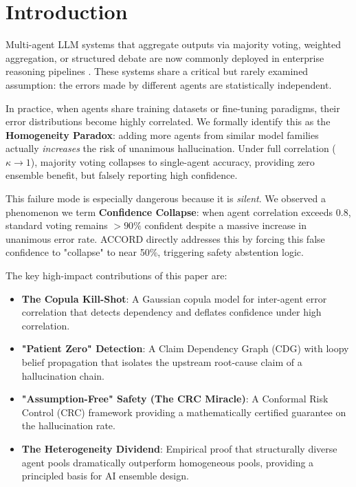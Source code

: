 \documentclass[conference]{IEEEtran}
\begin{document}
\section{Introduction}

Multi-agent LLM systems that aggregate outputs via majority voting, weighted aggregation, or structured debate are now commonly deployed in enterprise reasoning pipelines \cite{wang2022selfconsistency, du2023debate}. These systems share a critical but rarely examined assumption: the errors made by different agents are statistically independent. 

In practice, when agents share training datasets or fine-tuning paradigms, their error distributions become highly correlated. We formally identify this as the \textbf{Homogeneity Paradox}: adding more agents from similar model families actually \textit{increases} the risk of unanimous hallucination. Under full correlation ($\kappa \to 1$), majority voting collapses to single-agent accuracy, providing zero ensemble benefit, but falsely reporting high confidence.

This failure mode is especially dangerous because it is \emph{silent}. We observed a phenomenon we term \textbf{Confidence Collapse}: when agent correlation exceeds 0.8, standard voting remains $>90\%$ confident despite a massive increase in unanimous error rate. ACCORD directly addresses this by forcing this false confidence to "collapse" to near 50\%, triggering safety abstention logic.

The key high-impact contributions of this paper are:
\begin{itemize}
  \item \textbf{The Copula Kill-Shot}: A Gaussian copula model for inter-agent error correlation that detects dependency and deflates confidence under high correlation.
  \item \textbf{"Patient Zero" Detection}: A Claim Dependency Graph (CDG) with loopy belief propagation that isolates the upstream root-cause claim of a hallucination chain.
  \item \textbf{"Assumption-Free" Safety (The CRC Miracle)}: A Conformal Risk Control (CRC) framework providing a mathematically certified guarantee on the hallucination rate.
  \item \textbf{The Heterogeneity Dividend}: Empirical proof that structurally diverse agent pools dramatically outperform homogeneous pools, providing a principled basis for AI ensemble design.
\end{itemize}
\end{document}
